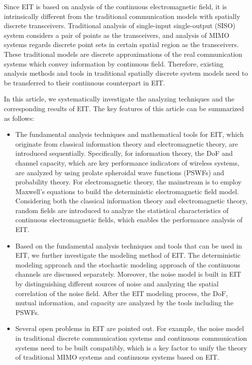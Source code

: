 \documentclass[journal,twocolumn]{IEEEtran}
\begin{document}
Since EIT is based on analysis of the continuous electromagnetic field, it is intrinsically different from the traditional communication models with spatially discrete transceivers. 
Traditional analysis of single-input single-output (SISO) system considers a pair of points as the transceivers, and analysis of MIMO systems regards discrete point sets in certain spatial region as the transceivers. 
These traditional models are discrete approximations of the real communication systems which convey information by continuous field. 
Therefore, existing analysis methods and tools in traditional spatially discrete system models need to be transferred to their continuous counterpart in EIT. 

In this article, we systematically investigate the analyzing techniques and the corresponding results of EIT. The key features of this article can be summarized as follows:
\begin{itemize}
\item{The fundamental analysis techniques and mathematical tools for EIT, which originate from classical information theory and electromagnetic theory, are introduced sequentially. Specifically, for information theory, the DoF and channel capacity, which are key performance indicators of wireless systems, are analyzed by using prolate spheroidal wave functions (PSWFs) and probability theory. For electromagnetic theory, the mainstream is to employ Maxwell's equations to build the deterministic electromagnetic field model. Considering both the classical information theory and electromagnetic theory, random fields are introduced to analyze the statistical characteristics of continuous electromagnetic fields, which enables the performance analysis of EIT. }
\item{Based on the fundamental analysis techniques and tools that can be used in EIT, we further investigate the modeling method of EIT. The deterministic modeling approach and the stochastic modeling approach of the continuous channels are discussed separately. Moreover, the noise model is built in EIT by distinguishing different sources of noise and analyzing the spatial correlation of the noise field. After the EIT modeling process, the DoF, mutual information, and capacity are analyzed by the tools including the PSWFs.} 
\item{Several open problems in EIT are pointed out. For example, the noise model in traditional discrete communication systems and continuous communication systems need to be built compatibly, which is a key factor to unify the theory of traditional MIMO systems and continuous systems based on EIT.}
\end{itemize}
\end{document}
